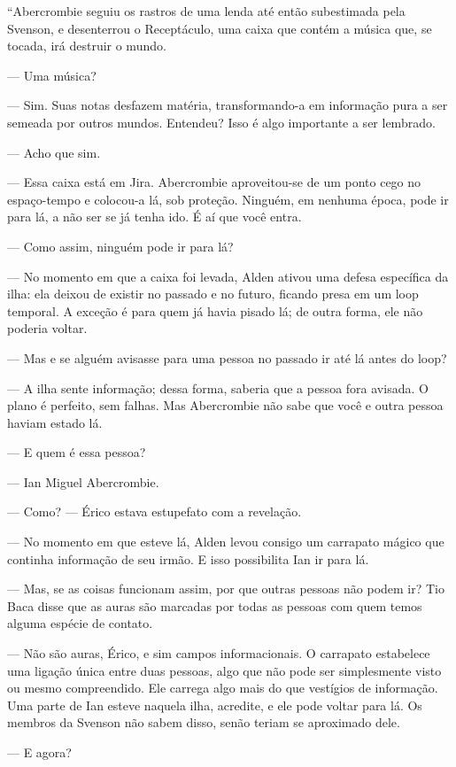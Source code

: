 “Abercrombie seguiu os rastros de uma lenda até então subestimada pela Svenson,
e desenterrou o Receptáculo, uma caixa que contém a música que, se tocada, irá
destruir o mundo.

--- Uma música?

--- Sim. Suas notas desfazem matéria, transformando-a em informação pura a ser
semeada por outros mundos. Entendeu? Isso é algo importante a ser lembrado.

--- Acho que sim.

--- Essa caixa está em Jira. Abercrombie aproveitou-se de um ponto cego no
espaço-tempo e colocou-a lá, sob proteção. Ninguém, em nenhuma época, pode ir
para lá, a não ser se já tenha ido. É aí que você entra.

--- Como assim, ninguém pode ir para lá?

--- No momento em que a caixa foi levada, Alden ativou uma defesa específica da
ilha: ela deixou de existir no passado e no futuro, ficando presa em um loop
temporal. A exceção é para quem já havia pisado lá; de outra forma, ele não
poderia voltar.

--- Mas e se alguém avisasse para uma pessoa no passado ir até lá antes do
loop?

--- A ilha sente informação; dessa forma, saberia que a pessoa fora avisada. O
plano é perfeito, sem falhas. Mas Abercrombie não sabe que você e outra pessoa
haviam estado lá.

--- E quem é essa pessoa?

--- Ian Miguel Abercrombie.

--- Como? --- Érico estava estupefato com a revelação.

--- No momento em que esteve lá, Alden levou consigo um carrapato mágico que
continha informação de seu irmão. E isso possibilita Ian ir para lá.

--- Mas, se as coisas funcionam assim, por que outras pessoas não podem ir? Tio
Baca disse que as auras são marcadas por todas as pessoas com quem temos alguma
espécie de contato.

--- Não são auras, Érico, e sim campos informacionais. O carrapato estabelece
uma ligação única entre duas pessoas, algo que não pode ser simplesmente visto
ou mesmo compreendido. Ele carrega algo mais do que vestígios de informação.
Uma parte de Ian esteve naquela ilha, acredite, e ele pode voltar para lá. Os
membros da Svenson não sabem disso, senão teriam se aproximado dele.

--- E agora?

